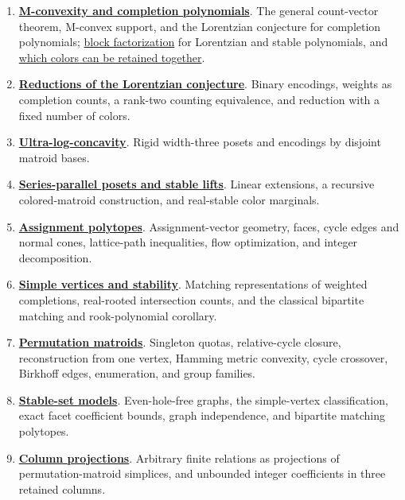 \begin{enumerate}
\item \href{rank.htm}{\textbf{M-convexity and completion polynomials}}.
The general count-vector theorem, M-convex support, and the Lorentzian
conjecture for completion polynomials; \href{rank.htm#blockFactorization}{block
factorization} for Lorentzian and stable polynomials, and
\href{rank.htm#jointColorPositions}{which colors can be retained together}.

\item \href{reductions.htm}{\textbf{Reductions of the Lorentzian conjecture}}.
Binary encodings, weights as completion counts, a rank-two counting
equivalence, and reduction with a fixed number of colors.

\item \href{log-concavity.htm}{\textbf{Ultra-log-concavity}}. Rigid
width-three posets and encodings by disjoint matroid bases.

\item \href{series-parallel.htm}{\textbf{Series-parallel posets and stable lifts}}.
Linear extensions, a recursive colored-matroid construction, and real-stable
color marginals.

\item \href{polytope.htm}{\textbf{Assignment polytopes}}. Assignment-vector
geometry, faces, cycle edges and normal cones, lattice-path inequalities,
flow optimization, and integer decomposition.

\item \href{stability.htm}{\textbf{Simple vertices and stability}}.
Matching representations of weighted completions, real-rooted intersection
counts, and the classical bipartite matching and rook-polynomial corollary.

\item \href{permutations.htm}{\textbf{Permutation matroids}}. Singleton
quotas, relative-cycle closure, reconstruction from one vertex,
Hamming metric convexity, cycle crossover, Birkhoff edges, enumeration,
and group families.

\item \href{stable-sets.htm}{\textbf{Stable-set models}}. Even-hole-free
graphs, the simple-vertex classification, exact facet coefficient bounds,
graph independence, and bipartite matching polytopes.

\item \href{projections.htm}{\textbf{Column projections}}. Arbitrary
finite relations as projections of permutation-matroid simplices, and
unbounded integer coefficients in three retained columns.
\end{enumerate}

